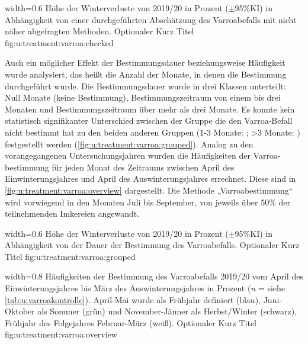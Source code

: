 {width=0.6\textwidth} %
{Höhe der Winterverluste von 2019/20 in Prozent ($\pm$95\%KI) in Abhängigkeit von einer durchgeführten Abschätzung des Varroabefalls mit nicht näher abgefragten Methoden.} %
{Optionaler Kurz Titel} %
{fig:u:treatment:varroa:checked} %

Auch ein möglicher Effekt der Bestimmungsdauer beziehungsweise Häufigkeit wurde analysiert, das heißt die Anzahl der Monate, in denen die Bestimmung durchgeführt wurde. Die Bestimmungsdauer wurde in drei Klassen unterteilt: Null Monate (keine Bestimmung), Bestimmungszeitraum von einem bis drei Monaten und Bestimmungszeitraum über mehr als drei Monate. Es konnte kein statistisch signifikanter Unterschied zwischen der Gruppe die den Varroa-Befall nicht bestimmt hat  zu den beiden anderen Gruppen (1-3 Monate: ; >3 Monate: ) festgestellt werden (\cref{fig:u:treatment:varroa:grouped}). 
\newline
Analog zu den vorangegangenen Untersuchungsjahren wurden die Häufigkeiten der Varroa-bestimmung für jeden Monat des Zeitraums zwischen April des Einwinterungsjahres und April des Auswinterungsjahres errechnet. Diese sind in \cref{fig:u:treatment:varroa:overview} dargestellt. Die Methode „Varroabestimmung`` wird vorwiegend in den Monaten Juli bis September, von jeweils über 50\% der teilnehmenden Imkereien angewandt.

{width=0.6\textwidth} %
{Höhe der Winterverluste von 2019/20 in Prozent ($\pm$95\%KI) in Abhängigkeit von der Dauer der Bestimmung des Varroabefalls.} %
{Optionaler Kurz Titel} %
{fig:u:treatment:varroa:grouped} %

{width=0.8\textwidth} %
{Häufigkeiten der Bestimmung des Varroabefalls 2019/20 vom April des Einwinterungsjahres bis März des Auswinterungsjahres in Prozent (\textit{n} = siehe \cref{tab:u:varroakontrolle}). April-Mai wurde als Frühjahr definiert (blau), Juni-Oktober als Sommer (grün) und November-Jänner als Herbst/Winter (schwarz), Frühjahr des Folgejahres Februar-März (weiß).} %
{Optionaler Kurz Titel} %
{fig:u:treatment:varroa:overview} %

